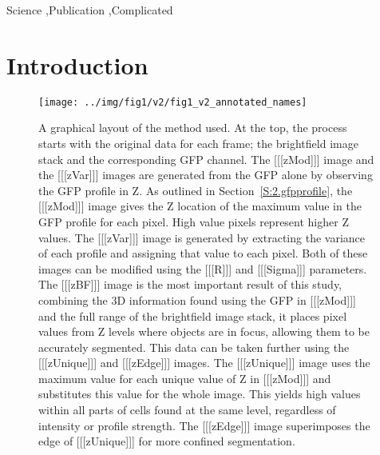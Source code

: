 \documentclass[preprint,11pt,5p,twocolumn]{elsarticle}
\begin{document}
\begin{frontmatter}
\begin{abstract}
\end{abstract}

\begin{keyword}
Science \sep Publication \sep Complicated


\end{keyword}

\end{frontmatter}


\section{Introduction}
\label{S:1}

\begin{figure}
\centering\texttt{[image: ../img/fig1/v2/fig1\_v2\_annotated\_names]}
\label{fig:method_flowchart}
\caption{A graphical layout of the method used. At the top, the process starts with the original data for each frame; the brightfield image stack and the corresponding GFP channel. The [[[zMod]]] image and the [[[zVar]]] images are generated from the GFP alone by observing the GFP profile in Z. As outlined in Section~\ref{S:2.gfpprofile}, the [[[zMod]]] image gives the Z location of the maximum value in the GFP profile for each pixel. High value pixels represent higher Z values. The [[[zVar]]] image is generated by extracting the variance of each profile and assigning that value to each pixel. Both of these images can be modified using the [[[R]]] and [[[Sigma]]] parameters. The [[[zBF]]] image is the most important result of this study, combining the 3D information found using the GFP in [[[zMod]]] and the full range of the brightfield image stack, it places pixel values from Z levels where objects are in focus, allowing them to be accurately segmented. This data can be taken further using the [[[zUnique]]] and [[[zEdge]]] images. The [[[zUnique]]] image uses the maximum value for each unique value of Z in [[[zMod]]] and substitutes this value for the whole image. This yields high values within all parts of cells found at the same level, regardless of intensity or profile strength. The [[[zEdge]]] image superimposes the edge of [[[zUnique]]] for more confined segmentation.}
\end{figure}
\end{document}
